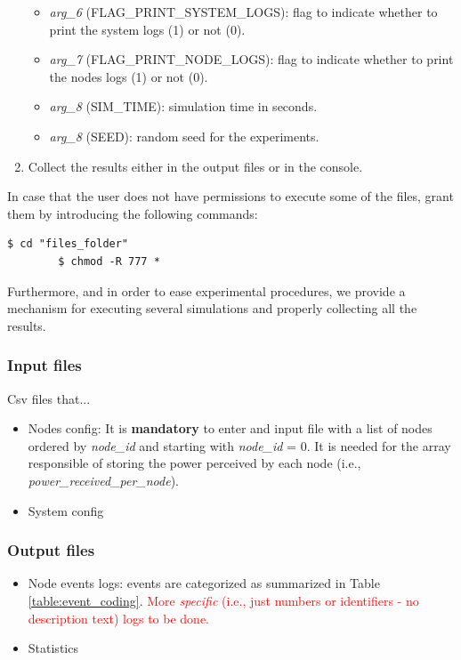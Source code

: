 \documentclass[a4paper]{article}
\begin{document}
\begin{enumerate}
\begin{itemize}
		            \item \textit{arg\_6} (FLAG\_PRINT\_SYSTEM\_LOGS): flag to indicate whether to print the system logs (1) or not (0).
		            \item \textit{arg\_7} (FLAG\_PRINT\_NODE\_LOGS): flag to indicate whether to print the nodes logs (1) or not (0).
		            \item \textit{arg\_8} (SIM\_TIME): simulation time in seconds.
		            \item \textit{arg\_8} (SEED): random seed for the experiments.
				\end{itemize}
		    \item Collect the results either in the output files or in the console.
		\end{enumerate}
	
		In case that the user does not have permissions to execute some of the files, grant them by introducing the following commands:
		\begin{lstlisting}[frame=single]
		$ cd "files_folder"
		$ chmod -R 777 *
		\end{lstlisting}
		
		Furthermore, and in order to ease experimental procedures, we provide a mechanism for executing several simulations and properly collecting all the results. 
		
		\subsubsection{Input files}
		\label{section:input_files}	
		Csv files that...
		\begin{itemize}
			\item Nodes config: It is \textbf{mandatory} to enter and input file with a list of nodes ordered by \textit{node\_id} and starting with \textit{node\_id} = 0. It is needed for the array responsible of storing the power perceived by each node (i.e., \textit{power\_received\_per\_node}).
			\item System config
		\end{itemize}
	
		\subsubsection{Output files}
		\label{section:output_files}	
		\begin{itemize}
			\item Node events logs: events are categorized as summarized in Table \ref{table:event_coding}. \textcolor{red}{More \textit{specific} (i.e., just numbers or identifiers - no description text) logs to be done.}
			\item Statistics
		\end{itemize}
	
\end{document}
